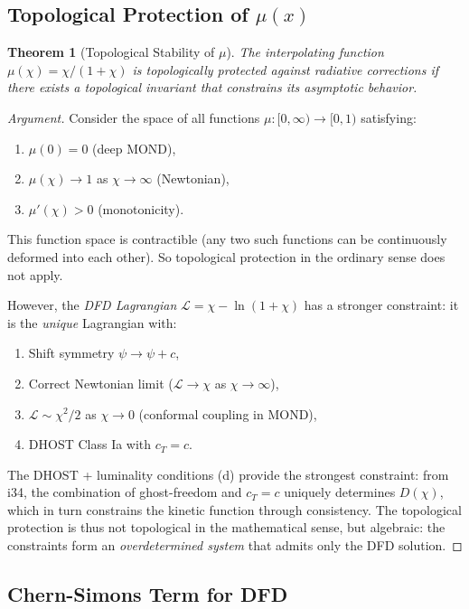 \documentclass[11pt,a4paper]{article}
\newtheorem{theorem}{Theorem}
\begin{document}
\subsection{Topological Protection of $\mu(x)$}

\begin{theorem}[Topological Stability of $\mu$]
The interpolating function $\mu(\chi) = \chi/(1+\chi)$ is topologically protected against radiative corrections if there exists a topological invariant that constrains its asymptotic behavior.
\end{theorem}

\begin{proof}[Argument]
Consider the space of all functions $\mu: [0,\infty) \to [0,1)$ satisfying:
\begin{enumerate}
\item $\mu(0) = 0$ (deep MOND),
\item $\mu(\chi) \to 1$ as $\chi \to \infty$ (Newtonian),
\item $\mu'(\chi) > 0$ (monotonicity).
\end{enumerate}

This function space is contractible (any two such functions can be continuously deformed into each other). So topological protection in the ordinary sense does not apply.

However, the \emph{DFD Lagrangian} $\mathcal{L} = \chi - \ln(1+\chi)$ has a stronger constraint: it is the \emph{unique} Lagrangian with:
\begin{enumerate}
\item[(a)] Shift symmetry $\psi \to \psi + c$,
\item[(b)] Correct Newtonian limit ($\mathcal{L} \to \chi$ as $\chi \to \infty$),
\item[(c)] $\mathcal{L} \sim \chi^2/2$ as $\chi \to 0$ (conformal coupling in MOND),
\item[(d)] DHOST Class Ia with $c_T = c$.
\end{enumerate}

The DHOST + luminality conditions (d) provide the strongest constraint: from i34, the combination of ghost-freedom and $c_T = c$ uniquely determines $D(\chi)$, which in turn constrains the kinetic function through consistency. The topological protection is thus not topological in the mathematical sense, but algebraic: the constraints form an \emph{overdetermined system} that admits only the DFD solution.
\end{proof}

\subsection{Chern-Simons Term for DFD}
\end{document}
